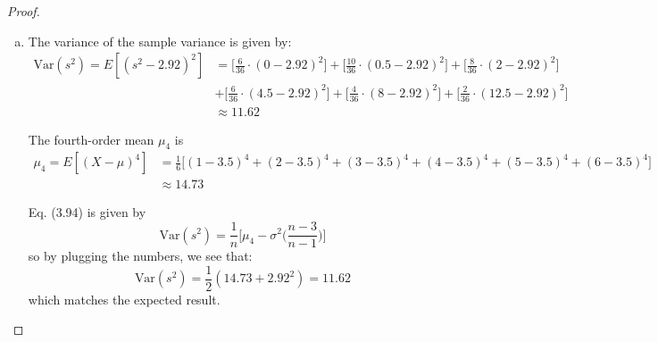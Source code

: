 \begin{proof}
\begin{enumerate}[(a)]
    \vspace{1em}

    \item The variance of the sample variance is given by:
        \begin{align*}
            \text{Var}(s^2) = E[(s^2 - 2.92)^2]
               &= \bigg[\frac{6}{36} \cdot (0 - 2.92)^2\bigg] 
                + \bigg[\frac{10}{36} \cdot (0.5 - 2.92)^2\bigg]
                + \bigg[\frac{8}{36} \cdot (2 - 2.92)^2\bigg] \\ 
               &+ \bigg[\frac{6}{36} \cdot (4.5 - 2.92)^2\bigg]
                + \bigg[\frac{4}{36} \cdot (8 - 2.92)^2\bigg]
                + \bigg[\frac{2}{36} \cdot (12.5 - 2.92)^2\bigg] \\
               &\approx 11.62
        \end{align*}

        The fourth-order mean $\mu_4$ is
        \begin{align*}
            \mu_4 = E[(X - \mu)^4] 
            &= \frac{1}{6}\big[(1 - 3.5)^4 + (2 - 3.5)^4 + (3 - 3.5)^4 
                + (4 - 3.5)^4 + (5 - 3.5)^4 + (6 - 3.5)^4] \\
            &\approx 14.73
        \end{align*}

        Eq. (3.94) is given by
        \begin{equation*}\tag{3.94}
            \text{Var}(s^2) = \frac{1}{n}\bigg[\mu_4 - \sigma^2\bigg(\frac{n-3}{n-1}\bigg)\bigg]
        \end{equation*}
        so by plugging the numbers, we see that: 
        \[
            \text{Var}(s^2) = \frac{1}{2}(14.73 + {2.92}^2) = 11.62
        \] 
        which matches the expected result.
    \end{enumerate}
\end{proof}
